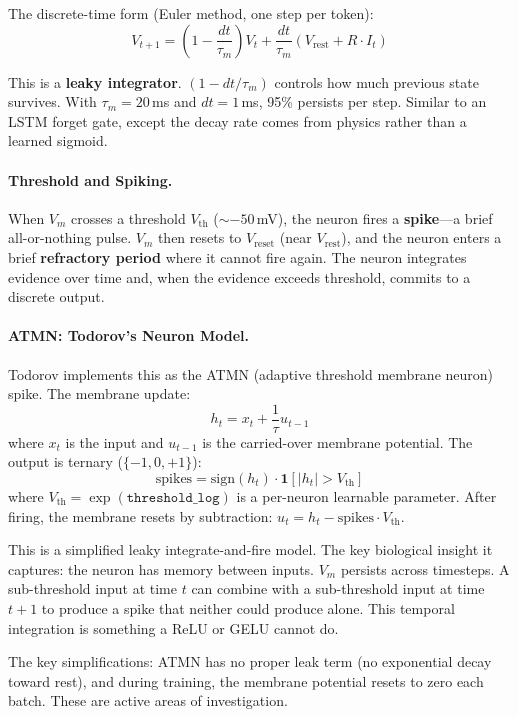 \documentclass[11pt,a4paper]{article}
\begin{document}
The discrete-time form (Euler method, one step per token):
\[
  V_{t+1} = \left(1 - \frac{dt}{\tau_m}\right) V_t + \frac{dt}{\tau_m}\left(V_{\mathrm{rest}} + R \cdot I_t\right)
\]

This is a \textbf{leaky integrator}. $(1 - dt/\tau_m)$ controls how much previous state survives. With $\tau_m = 20$\,ms and $dt = 1$\,ms, 95\% persists per step. Similar to an LSTM forget gate, except the decay rate comes from physics rather than a learned sigmoid.

\paragraph{Threshold and Spiking.}

When $V_m$ crosses a threshold $V_{\mathrm{th}}$ (${\sim}{-50}$\,mV), the neuron fires a \textbf{spike}---a brief all-or-nothing pulse. $V_m$ then resets to $V_{\mathrm{reset}}$ (near $V_{\mathrm{rest}}$), and the neuron enters a brief \textbf{refractory period} where it cannot fire again. The neuron integrates evidence over time and, when the evidence exceeds threshold, commits to a discrete output.

\paragraph{ATMN: Todorov's Neuron Model.}

Todorov implements this as the ATMN (adaptive threshold membrane neuron) spike. The membrane update:
\[
  h_t = x_t + \frac{1}{\tau} u_{t-1}
\]
where $x_t$ is the input and $u_{t-1}$ is the carried-over membrane potential. The output is ternary ($\{-1, 0, +1\}$):
\[
  \mathrm{spikes} = \mathrm{sign}(h_t) \cdot \mathbf{1}[|h_t| > V_{\mathrm{th}}]
\]
where $V_{\mathrm{th}} = \exp(\texttt{threshold\_log})$ is a per-neuron learnable parameter. After firing, the membrane resets by subtraction: $u_t = h_t - \mathrm{spikes} \cdot V_{\mathrm{th}}$.

This is a simplified leaky integrate-and-fire model. The key biological insight it captures: the neuron has memory between inputs. $V_m$ persists across timesteps. A sub-threshold input at time $t$ can combine with a sub-threshold input at time $t+1$ to produce a spike that neither could produce alone. This temporal integration is something a ReLU or GELU cannot do.

The key simplifications: ATMN has no proper leak term (no exponential decay toward rest), and during training, the membrane potential resets to zero each batch. These are active areas of investigation.
\end{document}
